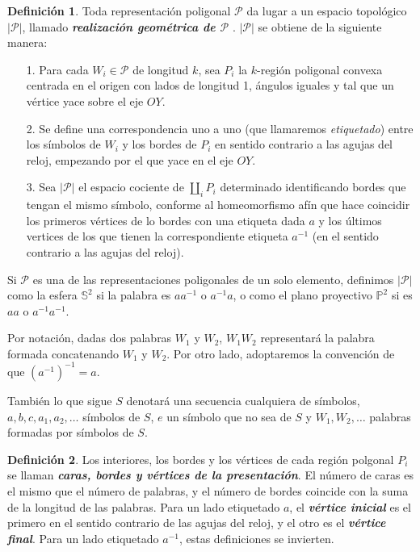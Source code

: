 \documentclass[10pt]{report}
\theoremstyle{definition}
\newtheorem{defin}{Definición}[section]
\begin{document}
\begin{defin}%
Toda representación poligonal $\mathcal{P}$ da lugar a un espacio topológico $|\mathcal{P}|$, llamado \textbf{\textit{realización geométrica de $\mathcal{P}$}} . $|\mathcal{P}|$ se obtiene de la siguiente manera:
\begin{itemize}
\item[1.] Para cada $W_i\in \mathcal{P}$ de longitud $k$, sea $P_i$ la $k$-región poligonal convexa centrada en el origen con lados de longitud 1, ángulos iguales y tal que un vértice yace sobre el eje $OY$.
\item[2.] Se define una correspondencia uno a uno (que llamaremos \textit{etiquetado}) entre los símbolos de $W_ i$ y los bordes de $P_i$ en sentido contrario a las agujas del reloj, empezando por el que yace en el eje $OY$.
\item[3.] Sea $|\mathcal{P}|$ el espacio cociente de $\coprod_i P_i$ determinado identificando bordes que tengan el mismo símbolo, conforme al homeomorfismo afín que hace coincidir los primeros vértices de lo bordes con una etiqueta dada $a$ y los últimos vertices de los que tienen la correspondiente etiqueta $a^{-1}$ (en el sentido contrario a las agujas del reloj).

\end{itemize}


Si $\mathcal{P}$ es una de las representaciones poligonales de un solo elemento, definimos $|\mathcal{P}|$ como la esfera $\mathbb{S}^2$ si la palabra es $aa^{-1}$ o $a^{-1}a$, o como el plano proyectivo $\mathbb{P}^2$ si es $aa$ o $a^{-1}a^{-1}$.%
\end{defin}

Por notación, dadas dos palabras $W_1$ y $W_2$, $W_1W_2$ representará la palabra formada concatenando $W_1$ y $W_2$. Por otro lado, adoptaremos la convención de que $(a^{-1})^{-1}=a$.

También lo que sigue $S$ denotará una secuencia cualquiera de símbolos, $a,b,c,a_1,a_2,\dots$ símbolos de $S$, $e$ un símbolo que no sea de $S$ y $W_1, W_2, \dots$ palabras formadas por símbolos de $S$.

\begin{defin}%
Los interiores, los bordes y los vértices de cada región polgonal $P_i$ se llaman \textbf{\emph{caras, bordes y vértices de la presentación}}. El número de caras es el mismo que el número de palabras, y el número de bordes coincide con la suma de la longitud de las palabras.
Para un lado etiquetado $a$, el \textbf{\emph{vértice inicial}} es el primero en el sentido contrario de las agujas del reloj, y el otro es el \textbf{\emph{vértice final}}. Para un lado etiquetado $a^{-1}$, estas definiciones se invierten. 
\end{defin}
\end{document}
